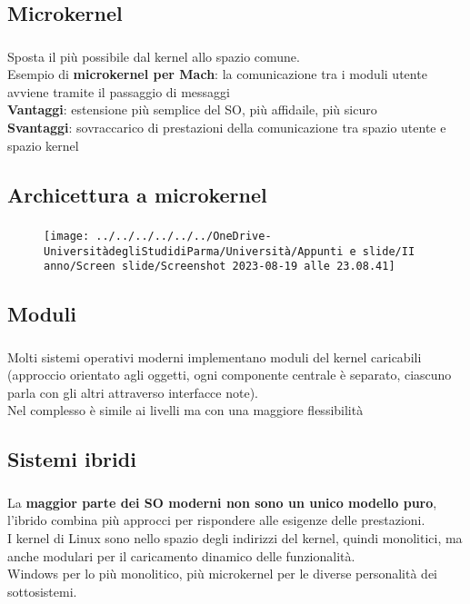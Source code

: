 \documentclass{beamer}
\newenvironment{mainframe}{
	\begin{frame}
		\frametitle{\insertsubsection}
		\framesubtitle{\insertsection}
	}{
	\end{frame}
}
\begin{document}
\subsection{Microkernel}
\begin{mainframe}
	Sposta il più possibile dal kernel allo spazio comune.\\
	Esempio di \textbf{microkernel per Mach}: la comunicazione tra i moduli utente avviene tramite il passaggio di messaggi\\
	\textbf{Vantaggi}: estensione più semplice del SO, più affidaile, più sicuro\\
	\textbf{Svantaggi}: sovraccarico di prestazioni della comunicazione tra spazio utente e spazio kernel
\end{mainframe}
\subsection{Archicettura a microkernel}
\begin{mainframe}
	\begin{figure}
		\centering
		\texttt{[image: ../../../../../../OneDrive-UniversitàdegliStudidiParma/Università/Appunti e slide/II anno/Screen slide/Screenshot 2023-08-19 alle 23.08.41]}
	\end{figure}
\end{mainframe}
\subsection{Moduli}
\begin{mainframe}
	Molti sistemi operativi moderni implementano moduli del kernel caricabili (approccio orientato agli oggetti, ogni componente centrale è separato, ciascuno parla con gli altri attraverso interfacce note).\\
	Nel complesso è simile ai livelli ma con una maggiore flessibilità
\end{mainframe}
\subsection{Sistemi ibridi}
\begin{mainframe}
	La \textbf{maggior parte dei SO moderni non sono un unico modello puro}, l'ibrido combina più approcci per rispondere alle esigenze delle prestazioni.\\
	I kernel di Linux sono nello spazio degli indirizzi del kernel, quindi monolitici, ma anche modulari per il caricamento dinamico delle funzionalità.\\
	Windows per lo più monolitico, più microkernel per le diverse personalità dei sottosistemi.
\end{mainframe}
\end{document}
